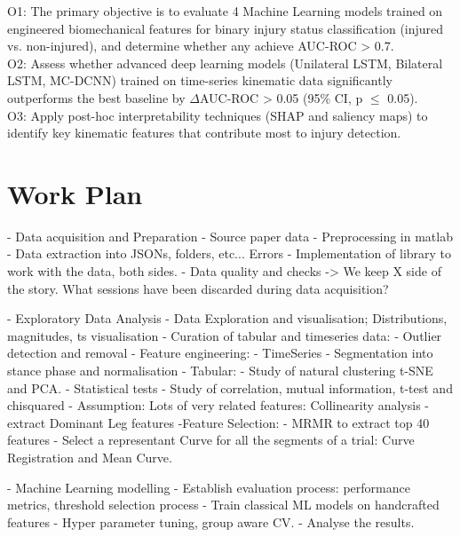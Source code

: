 
O1: The primary objective is to evaluate 4 Machine Learning models trained on engineered biomechanical features for binary injury status classification (injured vs. non-injured), and determine whether any achieve AUC-ROC > 0.7.\\

O2: Assess whether advanced deep learning models (Unilateral LSTM, Bilateral LSTM, MC-DCNN) trained on time-series kinematic data significantly outperforms the best baseline by $\Delta$AUC-ROC > 0.05 (95\% CI, p $\le$ 0.05).\\

O3: Apply post-hoc interpretability techniques (SHAP and saliency maps) to identify key kinematic features that contribute most to injury detection.

\section{Work Plan}\label{sec:intro-work-plan}
- Data acquisition and Preparation
    - Source paper data
    - Preprocessing in matlab
    - Data extraction into JSONs, folders, etc... Errors
    - Implementation of library to work with the data, both sides.
    - Data quality and checks -> We keep X side of the story. What sessions have been discarded during data acquisition?

- Exploratory Data Analysis
    - Data Exploration and visualisation; Distributions, magnitudes, ts visualisation
    - Curation of tabular and timeseries data:
        - Outlier detection and removal
    - Feature engineering:
        - TimeSeries
            - Segmentation into stance phase and normalisation
        - Tabular:
            - Study of natural clustering t-SNE and PCA.
            - Statistical tests - Study of correlation, mutual information, t-test and chisquared
            - Assumption: Lots of very related features: Collinearity analysis
            - extract Dominant Leg features
    -Feature Selection:
        - MRMR to extract top 40 features
        - Select a representant Curve for all the segments of a trial: Curve Registration and Mean Curve.

- Machine Learning modelling
    - Establish evaluation process: performance metrics, threshold selection process
    - Train classical ML models on handcrafted features
    - Hyper parameter tuning, group aware CV.
    - Analyse the results.

